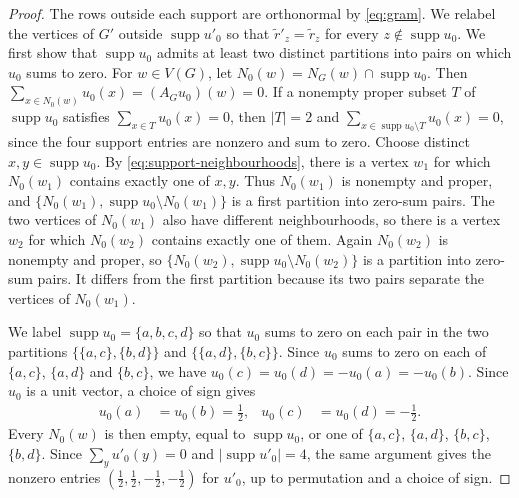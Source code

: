 \documentclass[10pt,a4paper]{article}
\theoremstyle{plain}
\theoremstyle{definition}
\DeclareMathOperator{\supp}{supp}
\begin{document}
\begin{proof}
  The rows outside each support are orthonormal by \cref{eq:gram}.
  We relabel the vertices of $G'$ outside $\supp u'_0$ so that
  $\tilde{r}'_z=\tilde{r}_z$ for every $z\notin\supp u_0$.
  We first show that $\supp u_0$ admits at least two distinct
  partitions into pairs on which $u_0$ sums to zero.
  For $w\in V(G)$, let $N_0(w)=N_G(w)\cap\supp u_0$.
  Then $\sum_{x\in N_0(w)}u_0(x)=(A_Gu_0)(w)=0$.
  If a nonempty proper subset $T$ of $\supp u_0$ satisfies
  $\sum_{x\in T}u_0(x)=0$, then $|T|=2$ and
  $\sum_{x\in\supp u_0\setminus T}u_0(x)=0$, since the four support
  entries are nonzero and sum to zero.
  Choose distinct $x,y\in\supp u_0$.
  By \cref{eq:support-neighbourhoods}, there is a vertex $w_1$ for which
  $N_0(w_1)$ contains exactly one of $x,y$.
  Thus $N_0(w_1)$ is nonempty and proper, and
  $\{N_0(w_1),\supp u_0\setminus N_0(w_1)\}$ is a first partition
  into zero-sum pairs.
  The two vertices of $N_0(w_1)$ also have different neighbourhoods,
  so there is a vertex $w_2$ for which $N_0(w_2)$ contains exactly
  one of them. Again $N_0(w_2)$ is nonempty and proper, so
  $\{N_0(w_2),\supp u_0\setminus N_0(w_2)\}$ is a partition into
  zero-sum pairs. It differs from the first partition because its
  two pairs separate the vertices of $N_0(w_1)$.

  We label $\supp u_0=\{a,b,c,d\}$ so that $u_0$ sums to zero
  on each pair in the two partitions
  $\{\{a,c\},\{b,d\}\}$ and $\{\{a,d\},\{b,c\}\}$.
  Since $u_0$ sums to zero on each of $\{a,c\}$, $\{a,d\}$ and
  $\{b,c\}$, we have
  $u_0(c)=u_0(d)=-u_0(a)=-u_0(b)$.
  Since $u_0$ is a unit vector, a choice of sign gives
  \begin{equation}
    \label{eq:support4}
    \begin{aligned}
      u_0(a)&=u_0(b)=\frac12, &
      u_0(c)&=u_0(d)=-\frac12.
    \end{aligned}
  \end{equation}
  Every $N_0(w)$ is then empty, equal to $\supp u_0$, or one of
  $\{a,c\}$, $\{a,d\}$, $\{b,c\}$, $\{b,d\}$.
  Since $\sum_yu'_0(y)=0$ and $|\supp u'_0|=4$, the same argument
  gives the nonzero entries $(\tfrac12,\tfrac12,-\tfrac12,-\tfrac12)$
  for $u'_0$, up to permutation and a choice of sign.


\end{proof}
\end{document}
